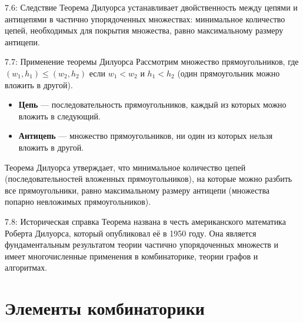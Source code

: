 \documentclass[a4paper,12pt]{article}
\begin{document}
	
	
	
	
	\begin{corollarybox}{7.6: Следствие}
		Теорема Дилуорса устанавливает двойственность между цепями и антицепями в частично упорядоченных множествах: минимальное количество цепей, необходимых для покрытия множества, равно максимальному размеру антицепи.
	\end{corollarybox}
	
	\begin{examplebox}{7.7: Применение теоремы Дилуорса}
		Рассмотрим множество прямоугольников, где $(w_1, h_1) \le (w_2, h_2)$ если $w_1 < w_2$ и $h_1 < h_2$ (один прямоугольник можно вложить в другой). 
		
		\begin{itemize}
			\item \textbf{Цепь} — последовательность прямоугольников, каждый из которых можно вложить в следующий.
			\item \textbf{Антицепь} — множество прямоугольников, ни один из которых нельзя вложить в другой.
		\end{itemize}
		
		Теорема Дилуорса утверждает, что минимальное количество цепей (последовательностей вложенных прямоугольников), на которые можно разбить все прямоугольники, равно максимальному размеру антицепи (множества попарно невложимых прямоугольников).
	\end{examplebox}
	
	\begin{notebook}{7.8: Историческая справка}
		Теорема названа в честь американского математика Роберта Дилуорса, который опубликовал её в 1950 году. Она является фундаментальным результатом теории частично упорядоченных множеств и имеет многочисленные применения в комбинаторике, теории графов и алгоритмах.
	\end{notebook}
	
	
	
	
	
	
	
	
	
	
	
	
	
	
	
	
	
	
	\newpage
	\section{Элементы комбинаторики}
	
\end{document}
